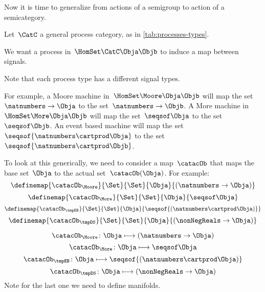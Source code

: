 Now it is time to generalize from actions of a semigroup to action of a semicategory.

Let~$\CatC$ a general process category, as in \cref{tab:processes-types}.

We want a process in~$\HomSet\CatC\Obja\Objb$ to induce a map between signals.

Note that each process type has a different signal types.

For example, a Moore machine in~$\HomSet\Moore\Obja\Objb$ will map the set~$\natnumbers \to \Obja$ to the set~$\natnumbers \to \Objb$.
A More machine in~$\HomSet\More\Obja\Objb$  will map the set~$\seqsof \Obja$ to the set~$\seqsof \Objb$.
An event based machine will map the set~$\seqsof{\natnumbers \cartprod \Obja}$ to the set~$\seqsof{\natnumbers \cartprod \Objb}$.

To look at this generically, we need to consider a map~$\catacOb$ that maps the base set~$\Obja$ to the actual set~$\catacOb(\Obja)$. For example:
\begin{equation}
  \definemap{\catacOb_{\Moore}}{\Set}{\Set}{\Obja}{(\natnumbers \to \Obja)}
\end{equation}
\begin{equation}
\definemap{\catacOb_{\More}}{\Set}{\Set}{\Obja}{\seqsof \Obja}
\end{equation}
\begin{equation}
\definemap{\catacOb_{\tmpEB}}{\Set}{\Set}{\Obja}{\seqsof{(\natnumbers \cartprod \Obja)}}
\end{equation}
\begin{equation}
\definemap{\catacOb_{\tmpDS}}{\Set}{\Set}{\Obja}{(\nonNegReals \to \Obja)}
\end{equation}

\begin{equation}\label{eq:phi-moore}
{\catacOb_{\Moore}}\colon{\Obja}\longmapsto{(\natnumbers \to \Obja)}
\end{equation}
\begin{equation}\label{eq:phi-more}
{\catacOb_{\More}}\colon{\Obja}\longmapsto{\seqsof \Obja}
\end{equation}
\begin{equation}\label{eq:phi-EB}
{\catacOb_{\tmpEB}}\colon{\Obja}\longmapsto{\seqsof{(\natnumbers \cartprod \Obja)}}
\end{equation}
\begin{equation}\label{eq:phi-DS}
{\catacOb_{\tmpDS}}\colon{\Obja}\longmapsto{(\nonNegReals \to \Obja)}
\end{equation}
Note for the last one we need to define manifolds.

